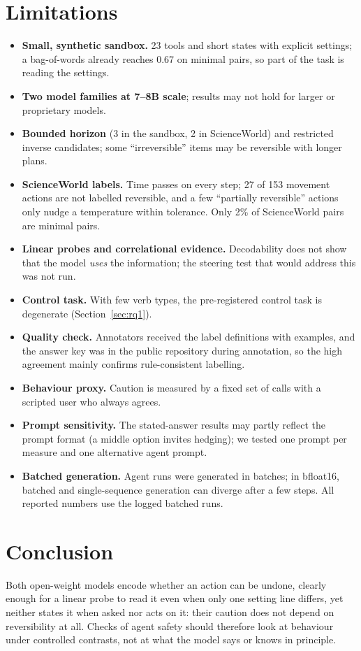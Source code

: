 \documentclass[11pt]{article}
\begin{document}
\section{Limitations}\label{sec:limits}
\begin{itemize}[leftmargin=*,itemsep=1pt,topsep=2pt]
\item \textbf{Small, synthetic sandbox.} 23 tools and short states with explicit settings; a bag-of-words already
reaches 0.67 on minimal pairs, so part of the task is reading the settings.
\item \textbf{Two model families at 7--8B scale}; results may not hold for larger or proprietary models.
\item \textbf{Bounded horizon} (3 in the sandbox, 2 in ScienceWorld) and restricted inverse candidates; some
``irreversible'' items may be reversible with longer plans.
\item \textbf{ScienceWorld labels.} Time passes on every step; 27 of 153 movement actions are not labelled
reversible, and a few ``partially reversible'' actions only nudge a temperature within tolerance. Only 2\% of
ScienceWorld pairs are minimal pairs.
\item \textbf{Linear probes and correlational evidence.} Decodability does not show that the model \emph{uses} the
information; the steering test that would address this was not run.
\item \textbf{Control task.} With few verb types, the pre-registered control task is degenerate (Section~\ref{sec:rq1}).
\item \textbf{Quality check.} Annotators received the label definitions with examples, and the answer key was in the
public repository during annotation, so the high agreement mainly confirms rule-consistent labelling.
\item \textbf{Behaviour proxy.} Caution is measured by a fixed set of calls with a scripted user who always agrees.
\item \textbf{Prompt sensitivity.} The stated-answer results may partly reflect the prompt format (a middle option
invites hedging); we tested one prompt per measure and one alternative agent prompt.
\item \textbf{Batched generation.} Agent runs were generated in batches; in bfloat16, batched and single-sequence
generation can diverge after a few steps. All reported numbers use the logged batched runs.
\end{itemize}

\section{Conclusion}
Both open-weight models encode whether an action can be undone, clearly enough for a linear probe to read it even
when only one setting line differs, yet neither states it when asked nor acts on it: their caution does not depend on
reversibility at all. Checks of agent safety should therefore look at behaviour under controlled contrasts, not at
what the model says or knows in principle.
\end{document}
